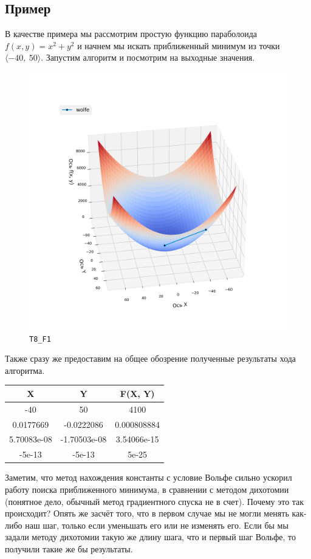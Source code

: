 \documentclass[12pt, a4paper, oneside, final]{article}
\begin{document}
	\subsection*{Пример}
	В качестве примера мы рассмотрим простую функцию параболоида $f(x, y) = x^{2} + y^{2}$ и начнем мы искать приближенный минимум из точки $\langle-40, ~ 50\rangle$. Запустим алгоритм и посмотрим на выходные значения.
	\begin{figure}[H]
		\centering
		\includegraphics[scale=0.68]{Image/T8_F1.png}
		\caption*{\texttt{T8\_F1}}
	\end{figure}
	Также сразу же предоставим на общее обозрение полученные результаты хода алгоритма.
	\begin{table}[H]
		\centering
		\begin{tabular}{|c|c|c|}
			\textbf{X} & \textbf{Y} & \textbf{F(X, Y)} \\ \hline
			-40 & 50 & 4100 \\
			0.0177669 & -0.0222086 & 0.000808884 \\
			5.70083e-08 & -1.70503e-08 & 3.54066e-15 \\
			-5e-13 & -5e-13 & 5e-25
		\end{tabular}
	\end{table}
	Заметим, что метод нахождения константы с условие Вольфе сильно ускорил работу поиска приближенного минимума, в сравнении с методом дихотомии (понятное дело, обычный метод градиентного спуска не в счет). Почему это так происходит? Опять же засчёт того, что в первом случае мы не могли менять как-либо наш шаг, только если уменьшать его или не изменять его. Если бы мы задали методу дихотомии такую же длину шага, что и первый шаг Вольфе, то получили такие же бы результаты.
\end{document}
